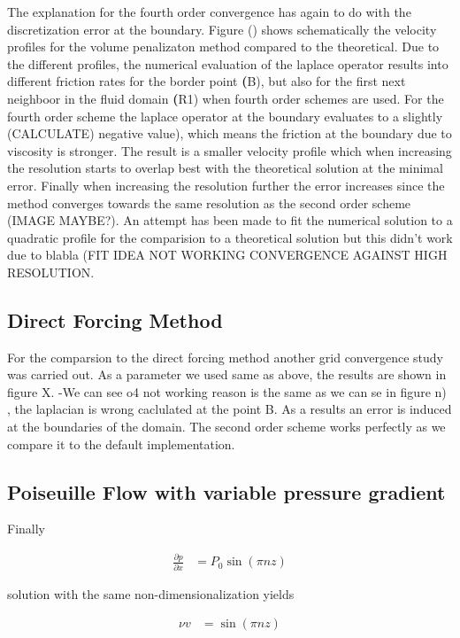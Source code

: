 The explanation for the fourth order convergence has again to do with the discretization error at the boundary.
Figure () shows schematically the velocity profiles for the volume penalizaton method compared to the theoretical.
Due to the different  profiles, the numerical evaluation of the laplace operator results
into different friction rates for the border point \textbf(B), but  also for the first next neighboor in the fluid domain \textbf(R1) when fourth order schemes are used.
For the fourth order scheme the laplace operator at the boundary evaluates to a slightly (CALCULATE) negative value), which means the friction at the boundary due to
viscosity is stronger. The result is a smaller velocity profile which when increasing the resolution starts to overlap best with the theoretical solution at the minimal error.
Finally when increasing the resolution further the error increases since the method converges towards the same resolution as the second order scheme (IMAGE MAYBE?).
An attempt has been made to fit the numerical solution to a quadratic profile for the comparision to a theoretical solution but this didn't work due to blabla
(FIT IDEA NOT WORKING CONVERGENCE AGAINST HIGH RESOLUTION.

\subsection{Direct Forcing Method}

For the comparsion to the direct forcing method another grid convergence study was carried out.  As a parameter we used same as above, the results are shown in figure X.
-We can see o4 not working reason is the same as we can se in figure n) , the laplacian is wrong caclulated at the point B.
As a results an error is induced at the boundaries of the domain.
The second order scheme works perfectly as we compare it to the default implementation.

\subsection{Poiseuille Flow with variable pressure gradient}

Finally

\begin{align}
\frac{\partial p}{\partial x} &= P_0 \sin(\pi n z)
\end{align}

solution with the same non-dimensionalization yields

\begin{align}
 \nu v &=  \sin(\pi n z)
\end{align}

